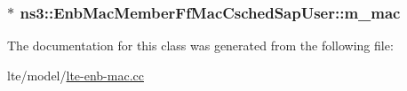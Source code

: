 \subsubsection[{\texorpdfstring{m\+\_\+mac}{m_mac}}]{$\ast$ ns3\+::\+Enb\+Mac\+Member\+Ff\+Mac\+Csched\+Sap\+User\+::m\+\_\+mac\hspace{0.3cm}{\ttfamily [private]}}\hypertarget{classns3_1_1EnbMacMemberFfMacCschedSapUser_a547e9a1b3e13a73d48a3dc12ab0fd502}{}\label{classns3_1_1EnbMacMemberFfMacCschedSapUser_a547e9a1b3e13a73d48a3dc12ab0fd502}


The documentation for this class was generated from the following file\+:\begin{DoxyCompactItemize}
\item 
lte/model/\hyperlink{lte-enb-mac_8cc}{lte-\/enb-\/mac.\+cc}\end{DoxyCompactItemize}
